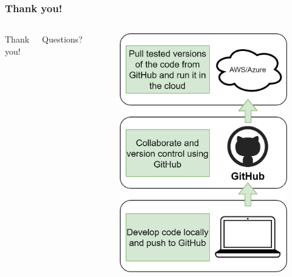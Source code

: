 \documentclass[aspectratio=169]{beamer} %
\begin{document}
\begin{frame}
	\frametitle{Thank you!}

	\begin{columns}[c]


		\Huge Thank you!

		\vspace{1cm}

		\Huge Questions?

		\begin{figure}
			\centering
			\includegraphics[width=.7\textwidth]{./img/code-workflow.png}
		\end{figure}

	\end{columns}
\end{frame}
\end{document}
